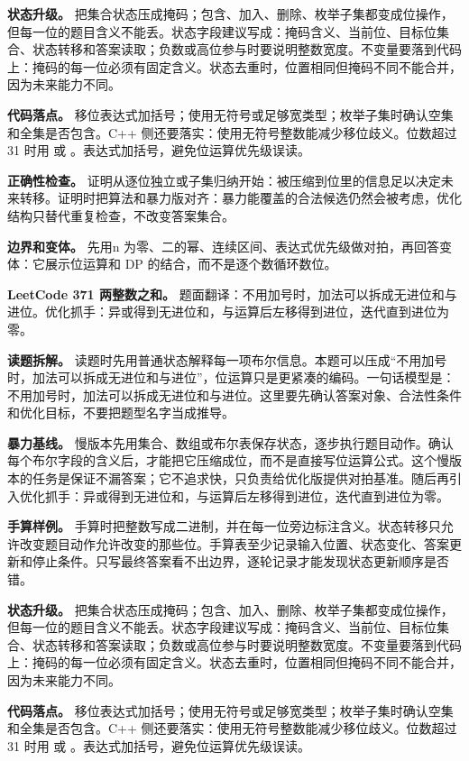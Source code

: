 \textbf{状态升级。} 把集合状态压成掩码；包含、加入、删除、枚举子集都变成位操作，但每一位的题目含义不能丢。状态字段建议写成：掩码含义、当前位、目标位集合、状态转移和答案读取；负数或高位参与时要说明整数宽度。不变量要落到代码上：掩码的每一位必须有固定含义。状态去重时，位置相同但掩码不同不能合并，因为未来能力不同。

\textbf{代码落点。} 移位表达式加括号；使用无符号或足够宽类型；枚举子集时确认空集和全集是否包含。C++ 侧还要落实：使用无符号整数能减少移位歧义。位数超过 31 时用  或 。表达式加括号，避免位运算优先级误读。

\textbf{正确性检查。} 证明从逐位独立或子集归纳开始：被压缩到位里的信息足以决定未来转移。证明时把算法和暴力版对齐：暴力能覆盖的合法候选仍然会被考虑，优化结构只替代重复检查，不改变答案集合。

\textbf{边界和变体。} 先用n 为零、二的幂、连续区间、表达式优先级做对拍，再回答变体：它展示位运算和 DP 的结合，而不是逐个数循环数位。

\noindent\textbf{LeetCode 371 两整数之和。} 题面翻译：不用加号时，加法可以拆成无进位和与进位。优化抓手：异或得到无进位和，与运算后左移得到进位，迭代直到进位为零。

\textbf{读题拆解。} 读题时先用普通状态解释每一项布尔信息。本题可以压成“不用加号时，加法可以拆成无进位和与进位”，位运算只是更紧凑的编码。一句话模型是：不用加号时，加法可以拆成无进位和与进位。这里要先确认答案对象、合法性条件和优化目标，不要把题型名字当成推导。

\textbf{暴力基线。} 慢版本先用集合、数组或布尔表保存状态，逐步执行题目动作。确认每个布尔字段的含义后，才能把它压缩成位，而不是直接写位运算公式。这个慢版本的任务是保证不漏答案；它不追求快，只负责给优化版提供对拍基准。随后再引入优化抓手：异或得到无进位和，与运算后左移得到进位，迭代直到进位为零。

\textbf{手算样例。} 手算时把整数写成二进制，并在每一位旁边标注含义。状态转移只允许改变题目动作允许改变的那些位。手算表至少记录输入位置、状态变化、答案更新和停止条件。只写最终答案看不出边界，逐轮记录才能发现状态更新顺序是否错。

\textbf{状态升级。} 把集合状态压成掩码；包含、加入、删除、枚举子集都变成位操作，但每一位的题目含义不能丢。状态字段建议写成：掩码含义、当前位、目标位集合、状态转移和答案读取；负数或高位参与时要说明整数宽度。不变量要落到代码上：掩码的每一位必须有固定含义。状态去重时，位置相同但掩码不同不能合并，因为未来能力不同。

\textbf{代码落点。} 移位表达式加括号；使用无符号或足够宽类型；枚举子集时确认空集和全集是否包含。C++ 侧还要落实：使用无符号整数能减少移位歧义。位数超过 31 时用  或 。表达式加括号，避免位运算优先级误读。

